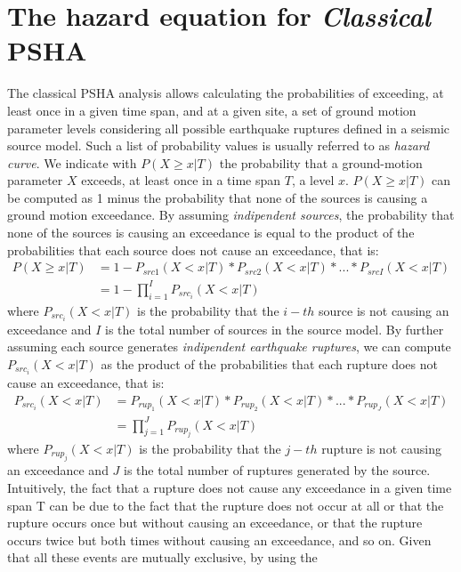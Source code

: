 \section{The hazard equation for \textit{Classical} PSHA}
The classical PSHA analysis allows calculating the probabilities of exceeding, at least once in a given time
span, and at a given site, a set of ground motion parameter levels considering all possible earthquake ruptures
defined in a seismic source model. Such a list of probability values is usually referred to as \textit{hazard curve}.
We indicate with $P(X \ge x | T)$ the probability that a ground-motion parameter $X$ exceeds, at least once in
a time span $T$, a level $x$. $P(X \ge x | T)$ can be computed as 1 minus the probability that none of the
sources is causing a ground motion exceedance. By assuming \textit{indipendent sources}, the probability
that none of the sources is causing an exceedance is equal to the product of the probabilities that each source
does not cause an exceedance, that is:
\begin{align}
\label{eq:hazard_eq}
P(X \ge x | T) & =  1 - P_{src1}(X < x | T) * P_{src2}(X < x | T) * ... * P_{srcI}(X < x | T) \nonumber \\
		      & =  1 - \prod_{i=1}^{I} P_{src_{i}}(X < x | T)
\end{align}
where $P_{src_{i}}(X < x | T)$ is the probability that the $i-th$ source is not causing an exceedance and $I$ is the
total number of sources in the source model. By further assuming each source generates \textit{indipendent
earthquake ruptures}, we can compute $P_{src_{i}}(X < x | T)$ as the product of the probabilities that each rupture
does not cause an exceedance, that is:
\begin{align}
\label{eq:prup_noexceed_src}
P_{src_{i}}(X < x | T) & = P_{rup_{1}}(X < x | T) * P_{rup_{2}}(X < x | T) * ... * P_{rup_{J}}(X < x | T) \nonumber \\
			        & = \prod_{j=1}^{J} P_{rup_{j}}(X < x | T)
\end{align}
where $P_{rup_{j}}(X < x | T)$ is the probability that the $j-th$ rupture is not causing an exceedance and $J$ is
the total number of ruptures generated by the source. Intuitively, the fact that a rupture does not cause any
exceedance in a given time span T can be due to the fact that the rupture does not occur at all or that the
rupture occurs once but without causing an exceedance, or that the rupture occurs twice but both times
without causing an exceedance, and so on. Given that all these events are mutually exclusive, by using the
